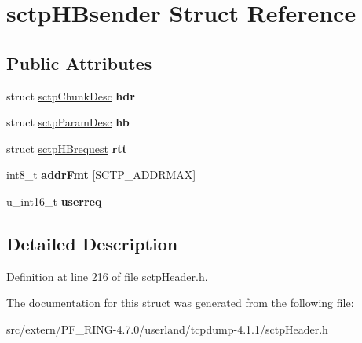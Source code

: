 \hypertarget{structsctp_h_bsender}{
\section{sctpHBsender Struct Reference}
\label{structsctp_h_bsender}
}
\subsection*{Public Attributes}
\begin{DoxyCompactItemize}
\item 
\hypertarget{structsctp_h_bsender_a16e4e88ef279417b1314bec663661e6d}{
struct \hyperlink{structsctp_chunk_desc}{sctpChunkDesc} {\bfseries hdr}}
\label{structsctp_h_bsender_a16e4e88ef279417b1314bec663661e6d}

\item 
\hypertarget{structsctp_h_bsender_a3b8c07191d3aaa3c99277a54b2246368}{
struct \hyperlink{structsctp_param_desc}{sctpParamDesc} {\bfseries hb}}
\label{structsctp_h_bsender_a3b8c07191d3aaa3c99277a54b2246368}

\item 
\hypertarget{structsctp_h_bsender_a424f3d445f76f10e3cd4c003df96d631}{
struct \hyperlink{structsctp_h_brequest}{sctpHBrequest} {\bfseries rtt}}
\label{structsctp_h_bsender_a424f3d445f76f10e3cd4c003df96d631}

\item 
\hypertarget{structsctp_h_bsender_ab520100f1e7ab630e8207b7307d22e3a}{
int8\_\-t {\bfseries addrFmt} \mbox{[}SCTP\_\-ADDRMAX\mbox{]}}
\label{structsctp_h_bsender_ab520100f1e7ab630e8207b7307d22e3a}

\item 
\hypertarget{structsctp_h_bsender_a8657429f765bf9d779d1a916c7559f26}{
u\_\-int16\_\-t {\bfseries userreq}}
\label{structsctp_h_bsender_a8657429f765bf9d779d1a916c7559f26}

\end{DoxyCompactItemize}


\subsection{Detailed Description}


Definition at line 216 of file sctpHeader.h.



The documentation for this struct was generated from the following file:\begin{DoxyCompactItemize}
\item 
src/extern/PF\_\-RING-\/4.7.0/userland/tcpdump-\/4.1.1/sctpHeader.h\end{DoxyCompactItemize}
